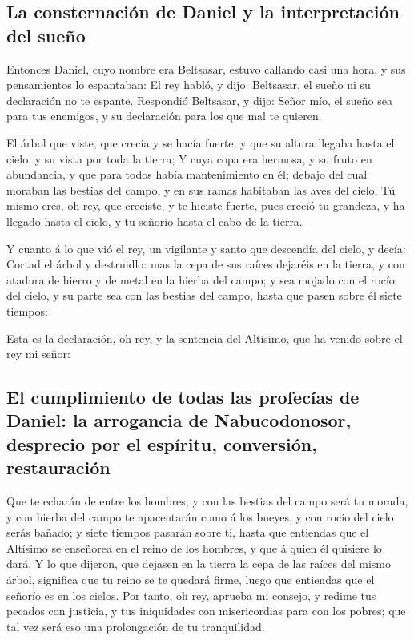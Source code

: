 \hypertarget{la-consternaciuxf3n-de-daniel-y-la-interpretaciuxf3n-del-sueuxf1o}{%
\subsection{La consternación de Daniel y la interpretación del
sueño}\label{la-consternaciuxf3n-de-daniel-y-la-interpretaciuxf3n-del-sueuxf1o}}

 Entonces Daniel, cuyo nombre era Beltsasar, estuvo
callando casi una hora, y sus pensamientos lo espantaban: El rey habló,
y dijo: Beltsasar, el sueño ni su declaración no te espante. Respondió
Beltsasar, y dijo: Señor mío, el sueño sea para tus enemigos, y su
declaración para los que mal te quieren.

 El árbol que viste, que crecía y se hacía fuerte, y que su
altura llegaba hasta el cielo, y su vista por toda la tierra;
 Y cuya copa era hermosa, y su fruto en abundancia, y que
para todos había mantenimiento en él; debajo del cual moraban las
bestias del campo, y en sus ramas habitaban las aves del cielo,
 Tú mismo eres, oh rey, que creciste, y te hiciste fuerte,
pues creció tu grandeza, y ha llegado hasta el cielo, y tu señorío hasta
el cabo de la tierra.

 Y cuanto á lo que vió el rey, un vigilante y santo que
descendía del cielo, y decía: Cortad el árbol y destruidlo: mas la cepa
de sus raíces dejaréis en la tierra, y con atadura de hierro y de metal
en la hierba del campo; y sea mojado con el rocío del cielo, y su parte
sea con las bestias del campo, hasta que pasen sobre él siete tiempos:

 Esta es la declaración, oh rey, y la sentencia del
Altísimo, que ha venido sobre el rey mi señor:

\hypertarget{el-cumplimiento-de-todas-las-profecuxedas-de-daniel-la-arrogancia-de-nabucodonosor-desprecio-por-el-espuxedritu-conversiuxf3n-restauraciuxf3n}{%
\subsection{El cumplimiento de todas las profecías de Daniel: la
arrogancia de Nabucodonosor, desprecio por el espíritu, conversión,
restauración}\label{el-cumplimiento-de-todas-las-profecuxedas-de-daniel-la-arrogancia-de-nabucodonosor-desprecio-por-el-espuxedritu-conversiuxf3n-restauraciuxf3n}}

 Que te echarán de entre los hombres, y con las bestias del
campo será tu morada, y con hierba del campo te apacentarán como á los
bueyes, y con rocío del cielo serás bañado; y siete tiempos pasarán
sobre ti, hasta que entiendas que el Altísimo se enseñorea en el reino
de los hombres, y que á quien él quisiere lo dará.  Y lo
que dijeron, que dejasen en la tierra la cepa de las raíces del mismo
árbol, significa que tu reino se te quedará firme, luego que entiendas
que el señorío es en los cielos.  Por tanto, oh rey,
aprueba mi consejo, y redime tus pecados con justicia, y tus iniquidades
con misericordias para con los pobres; que tal vez será eso una
prolongación de tu tranquilidad.

